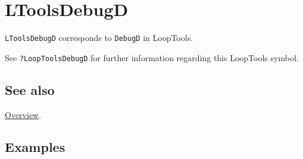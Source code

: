 \documentclass[../FeynHelpersManual.tex]{subfiles}
\begin{document}
\hypertarget{ltoolsdebugd}{
\section{LToolsDebugD}\label{ltoolsdebugd}}

\texttt{LToolsDebugD} corresponds to \texttt{DebugD} in LoopTools.

See \texttt{?LoopTools\textasciigrave DebugD} for further information
regarding this LoopTools symbol.

\subsection{See also}

\hyperlink{toc}{Overview}.

\subsection{Examples}
\end{document}

